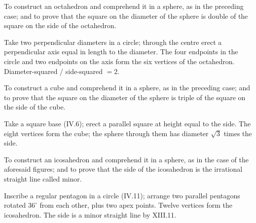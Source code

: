 \begin{claim}
\label{prop:XIII.14}
To construct an octahedron and comprehend it in a sphere, as in the
preceding case; and to prove that the square on the diameter of the
sphere is double of the square on the side of the octahedron.
\end{claim}
\begin{evidence}
\label{ev:XIII.14}
Take two perpendicular diameters in a circle; through the centre
erect a perpendicular axis equal in length to the diameter.  The
four endpoints in the circle and two endpoints on the axis form the
six vertices of the octahedron.  Diameter-squared / side-squared $= 2$.
\end{evidence}

\begin{claim}
\label{prop:XIII.15}
To construct a cube and comprehend it in a sphere, as in the
preceding case; and to prove that the square on the diameter of the
sphere is triple of the square on the side of the cube.
\end{claim}
\begin{evidence}
\label{ev:XIII.15}
Take a square base (IV.6); erect a parallel square at height equal
to the side.  The eight vertices form the cube; the sphere through
them has diameter $\sqrt{3}$ times the side.
\end{evidence}

\begin{claim}
\label{prop:XIII.16}
To construct an icosahedron and comprehend it in a sphere, as in the
case of the aforesaid figures; and to prove that the side of the
icosahedron is the irrational straight line called minor.
\end{claim}
\begin{evidence}
\label{ev:XIII.16}
Inscribe a regular pentagon in a circle (IV.11); arrange two parallel
pentagons rotated $36^\circ$ from each other, plus two apex points.
Twelve vertices form the icosahedron.  The side is a minor straight
line by XIII.11.
\end{evidence}

